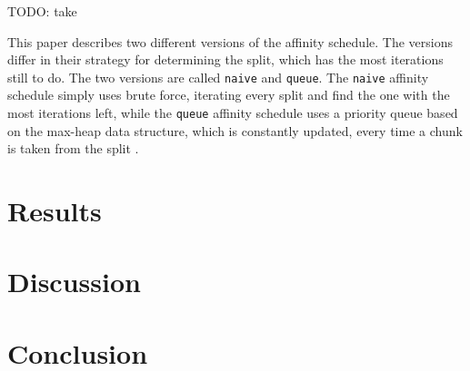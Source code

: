 \documentclass[twoside,11pt]{article}
\begin{document}
TODO: take

This paper describes two different versions of the affinity
schedule.
The versions differ in their strategy for determining the
split, which has the most iterations still to do.
The two versions are called \texttt{naive} and
\texttt{queue}.
The \texttt{naive} affinity schedule simply uses brute
force, iterating every split and find the one with the most
iterations left, while the \texttt{queue} affinity schedule
uses a priority queue based on the max-heap data structure,
which is constantly updated, every time a chunk is taken
from the split \citep[for the max-heap data structure see
e.g.][Chapter 6]{cormen}.




%


\section{Results} %


\section{Discussion} %


\section{Conclusion} %



\end{document}
